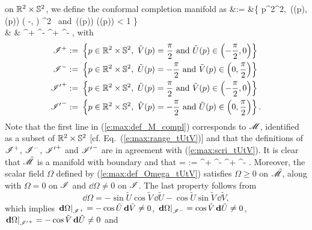 on $\mathbb{R}^2\times\mathbb{S}^2$, we define the conformal completion manifold as
\bea
    \tilde{\M} &:= &\left\{ p\in \R^2\times\SS^2,\  ((p),(p)) \in \left( -,  \right) ^2 \ \mbox{and}\
       \sinh(\tan {}(p)) \sinh(\tan {}(p)) < 1 \right\}
        \nonumber \\
       & & \cup \scri^+ \cup \scri^- ^+ ^- ,
        \label{e:max:def_M_compl}
\eea
with
\begin{subequations}\label{e:max:def_scri_R2S2}
\begin{align}
   \mathscr{I}^+ := &\ \left\{ p\in \mathbb{R}^2\times\mathbb{S}^2,\  \tilde{V}(p) = \frac{\pi}{2}
        \ \mbox{and}\ \tilde{U}(p) \in \left( -\frac{\pi}{2}, 0 \right) \right\}
            \label{e:max:def_scrip_R2S2} \\
    \mathscr{I}^- := &\ \left\{ p\in \mathbb{R}^2\times\mathbb{S}^2,\  \tilde{U}(p) = -\frac{\pi}{2}
        \ \mbox{and}\ \tilde{V}(p) \in \left( 0, \frac{\pi}{2}\right) \right\} \\
   {\mathscr{I}'}^+ := &\ \left\{ p\in \mathbb{R}^2\times\mathbb{S}^2,\  \tilde{U}(p) = \frac{\pi}{2}
        \ \mbox{and}\ \tilde{V}(p) \in \left( -\frac{\pi}{2}, 0 \right) \right\} \\
   {\mathscr{I}'}^- := &\ \left\{ p\in \mathbb{R}^2\times\mathbb{S}^2,\  \tilde{V}(p) = -\frac{\pi}{2}
        \ \mbox{and}\ \tilde{U}(p) \in \left( 0, \frac{\pi}{2}\right) \right\} .
\end{align}
\end{subequations}
Note that the first line in (\ref{e:max:def_M_compl}) corresponds to $\mathscr{M}$,
identified as a subset of $\mathbb{R}^2\times\mathbb{S}^2$ [cf. Eq.~(\ref{e:max:range_tUtV})]
and that the definitions of $\mathscr{I}^+$, $\mathscr{I}^-$, ${\mathscr{I}'}^+$ and ${\mathscr{I}'}^-$
are in agreement with (\ref{e:max:scri_tUtV}). It is clear that $\tilde{\mathscr{M}}$
is a manifold with boundary and that
\be \label{e:max:scri_tM_4parts}
    \partial\tilde{\M} = \scri := \scri^+ \cup \scri^- ^+
            \cup {\scri'}^- .
\ee
Moreover, the scalar field $\Omega$ defined by (\ref{e:max:def_Omega_tUtV})
satisfies $\Omega \geq 0$ on $\tilde{\mathscr{M}}$, along with
$\Omega = 0$ on $\mathscr{I}$ and $\dd\Omega\not = 0$ on $\mathscr{I}$. The last property
follows from
\[
    \dd\Omega = -\sin\tilde{U} \cos\tilde{V}\, \dd\tilde{U}
            -\cos\tilde{U} \sin\tilde{V}\, \dd\tilde{V} ,
\]
which implies
$\left.\mathbf{d}\Omega\right|_{\mathscr{I}^+} = -\cos\tilde{U}\, \mathbf{d}\tilde{V}\not=0$,
$\left.\mathbf{d}\Omega\right|_{\mathscr{I}^-} = \cos\tilde{V}\, \mathbf{d}\tilde{U}\not=0$,
$\left.\mathbf{d}\Omega\right|_{{\mathscr{I}'}^+} = -\cos\tilde{V}\, \mathbf{d}\tilde{U}\not=0$ and
